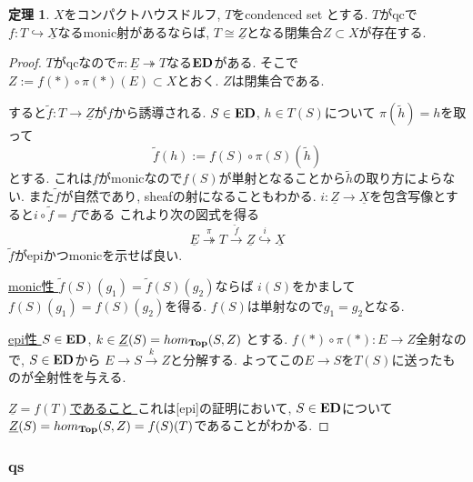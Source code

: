 \documentclass[dvipdfmx,a4paper,11pt]{article}
\theoremstyle{definition}
\newtheorem{thm}{定理}
\begin{document}
  \begin{tcolorbox}
 [colback = white, colframe = green!35!black, fonttitle = \bfseries,breakable = true]
 \begin{thm}\cite[Proposition 4.12.3]{Bar22}
 \label{thm-qs-monic}
$X$をコンパクトハウスドルフ, $T$をcondenced set とする.
$T$がqcで$f : T \hookrightarrow \underline{X}$なるmonic射があるならば, 
$T  \cong \underline{Z}$となる閉集合$Z \subset X$が存在する. 
 \end{thm}
 \end{tcolorbox}
 \begin{proof}
 $T$がqcなので$\pi : \underline{E} \twoheadrightarrow T$なる${\bf  ED}$がある. 
 そこで$Z:= f(\ast)\circ{\pi(\ast)}(E)  \subset X$とおく. 
 $Z$は閉集合である.
 
すると$\widetilde{f} : T \to \underline{Z}$が$f$から誘導される.
$S \in {\bf ED}$, $h \in T(S)$について
$\pi(\widetilde{h}) = h$を取って
$$
\widetilde{f}(h):= f(S) \circ \pi(S)(\widetilde{h})
$$
とする.
これは$f$がmonicなので$f(S)$が単射となることから$\widetilde{h}$の取り方によらない.
また$\widetilde{f}$が自然であり, sheafの射になることもわかる. 
$i : \underline{Z} \to \underline{X}$を包含写像とすると$i \circ \widetilde{f} = f$である
 これより次の図式を得る
 $$
 \underline{E} \overset{\pi}{\twoheadrightarrow}
 T \overset{\widetilde{f}}{\to}
  \underline{Z} \overset{i}{\hookrightarrow}
  \underline{X}
 $$
 $\widetilde{f}$がepiかつmonicを示せば良い.
 
 \underline{monic性 }$\widetilde{f}(S)(g_1) = \widetilde{f}(S)(g_2)$ならば
$i(S)$をかまして$f(S)(g_1) = f(S)(g_2)$を得る. $f(S)$は単射なので$g_1 = g_2$となる.

 \underline{epi性 } $S \in {\bf ED}$, $k \in \underline{Z}(S) = hom_{{\bf Top}}(S, Z)$
とする. $f(\ast)\circ{\pi(\ast)} : E \to Z$全射なので, $S \in {\bf ED}$から
$E \to S \overset{k}{\to} Z$と分解する. 
よってこの$E\to S$を$T(S)$に送ったものが全射性を与える.

 \underline{ $\underline{Z}=f(T)$であること }
これは[epi]の証明において, $S \in {\bf ED}$について$\underline{Z}(S) = hom_{{\bf Top}}(S, Z) = f(S)(T)$であることがわかる. 
 \end{proof}

 
 \subsubsection{qs}
 
\end{document}
